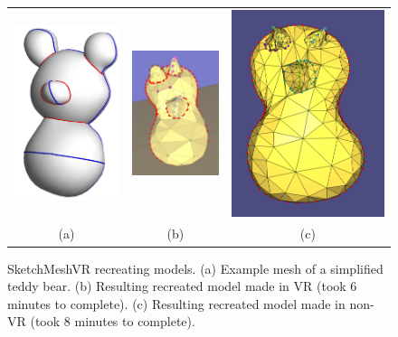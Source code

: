 \begin{figure}[!h]
    \centering
    \setlength{\tabcolsep}{0.0130\linewidth}
    \begin{tabular}{@{}ccc@{}}
    \includegraphics[width=0.3\linewidth]{figures/example_model_figure}&
  	\includegraphics[width=0.3\linewidth]{figures/results_teddy_model1}&
  	\includegraphics[width=0.3\linewidth]{figures/results_teddy_model_nonVR}\\

    (a)&(b)&(c)\\
    \end{tabular}
    \caption[SketchMeshVR simplified teddy bear model]{SketchMeshVR recreating models.
    	  \textup{(a)} Example mesh of a simplified teddy bear.
	  \textup{(b)} Resulting recreated model made in VR (took 6 minutes to complete).
	  \textup{(c)} Resulting recreated model made in non-VR (took 8 minutes to complete).
      \label{fig:recreate_teddy}}
\end{figure}


